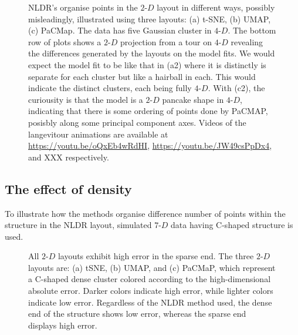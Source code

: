 \documentclass[
  12pt]{article}
\newcommand\gD{$2\text{-}D$}
\begin{document}
\begin{figure}[H]


\caption{\label{fig-five-gau-projs}NLDR's organise points in the \gD{}
layout in different ways, possibly misleadingly, illustrated using three
layouts: (a) t-SNE, (b) UMAP, (c) PaCMap. The data has five Gaussian
cluster in \(4\text{-}D\). The bottom row of plots shows a \gD{}
projection from a tour on \(4\text{-}D\) revealing the differences
generated by the layouts on the model fits. We would expect the model
fit to be like that in (a2) where it is distinctly is separate for each
cluster but like a hairball in each. This would indicate the distinct
clusters, each being fully \(4\text{-}D\). With (c2), the curiousity is
that the model is a \gD{} pancake shape in \(4\text{-}D\), indicating
that there is some ordering of points done by PaCMAP, posisbly along
some principal component axes. Videos of the langevitour animations are
available at \url{https://youtu.be/oQxEb4wRdHI},
\url{https://youtu.be/JW49csPpDx4}, and XXX respectively.}

\end{figure}%

\subsection{The effect of density}\label{the-effect-of-density}

To illustrate how the methods organise difference number of points
within the structure in the NLDR layout, simulated \(7\text{-}D\) data
having C-shaped structure is used.

\begin{figure}[H]


\caption{\label{fig-one-dens_clust-error}All \gD{} layouts exhibit high
error in the sparse end. The three \gD{} layouts are: (a) tSNE, (b)
UMAP, and (c) PaCMaP, which represent a C-shaped dense cluster colored
according to the high-dimensional absolute error. Darker colors indicate
high error, while lighter colors indicate low error. Regardless of the
NLDR method used, the dense end of the structure shows low error,
whereas the sparse end displays high error.}

\end{figure}%
\end{document}

